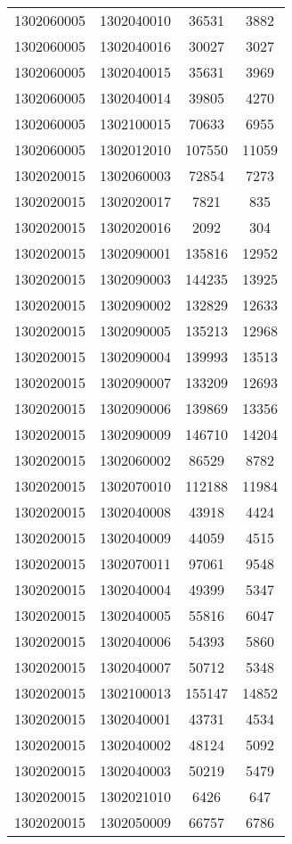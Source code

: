 \begin{longtable}{llcc}
1302060005 & 1302040010 & 36531 & 3882\\
1302060005 & 1302040016 & 30027 & 3027\\
1302060005 & 1302040015 & 35631 & 3969\\
1302060005 & 1302040014 & 39805 & 4270\\
1302060005 & 1302100015 & 70633 & 6955\\
1302060005 & 1302012010 & 107550 & 11059\\
1302020015 & 1302060003 & 72854 & 7273\\
1302020015 & 1302020017 & 7821 & 835\\
1302020015 & 1302020016 & 2092 & 304\\
1302020015 & 1302090001 & 135816 & 12952\\
1302020015 & 1302090003 & 144235 & 13925\\
1302020015 & 1302090002 & 132829 & 12633\\
1302020015 & 1302090005 & 135213 & 12968\\
1302020015 & 1302090004 & 139993 & 13513\\
1302020015 & 1302090007 & 133209 & 12693\\
1302020015 & 1302090006 & 139869 & 13356\\
1302020015 & 1302090009 & 146710 & 14204\\
1302020015 & 1302060002 & 86529 & 8782\\
1302020015 & 1302070010 & 112188 & 11984\\
1302020015 & 1302040008 & 43918 & 4424\\
1302020015 & 1302040009 & 44059 & 4515\\
1302020015 & 1302070011 & 97061 & 9548\\
1302020015 & 1302040004 & 49399 & 5347\\
1302020015 & 1302040005 & 55816 & 6047\\
1302020015 & 1302040006 & 54393 & 5860\\
1302020015 & 1302040007 & 50712 & 5348\\
1302020015 & 1302100013 & 155147 & 14852\\
1302020015 & 1302040001 & 43731 & 4534\\
1302020015 & 1302040002 & 48124 & 5092\\
1302020015 & 1302040003 & 50219 & 5479\\
1302020015 & 1302021010 & 6426 & 647\\
1302020015 & 1302050009 & 66757 & 6786\\

\end{longtable}
